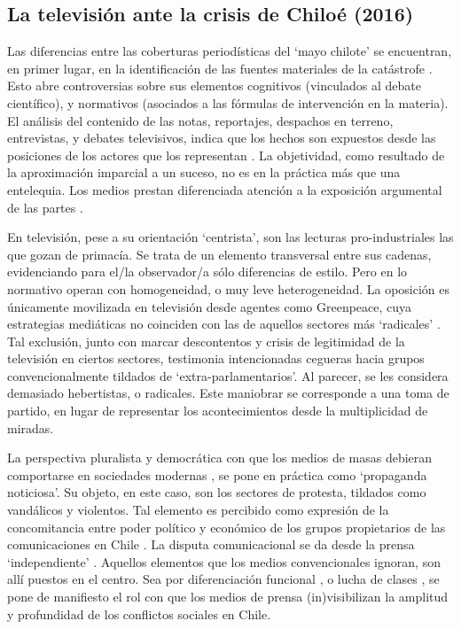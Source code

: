 \documentclass{textolivre}
\begin{document}
\subsection{La televisión ante la crisis de Chiloé (2016)}\label{sec-latelev}

Las diferencias entre las coberturas periodísticas del ‘mayo chilote’ se encuentran,
en primer lugar, en la identificación de las fuentes materiales de la catástrofe
\cite{Mascareo2018b}. Esto abre controversias sobre sus elementos cognitivos
(vinculados al debate científico), y normativos (asociados a las fórmulas de intervención
en la materia). El análisis del contenido de las notas, reportajes, despachos en terreno,
entrevistas, y debates televisivos, indica que los hechos son expuestos desde las
posiciones de los actores que los representan \cite{cabello2018}.
La objetividad, como resultado de la aproximación imparcial a un suceso, no es en la
práctica más que una entelequia. Los medios prestan diferenciada atención a la
exposición argumental de las partes \cite{ValdebenitoAllendes2018}.

En televisión, pese a su orientación ‘centrista’, son las lecturas pro-industriales las
que gozan de primacía. Se trata de un elemento transversal entre sus cadenas,
evidenciando para el/la observador/a sólo diferencias de estilo. Pero en lo normativo
operan con homogeneidad, o muy leve heterogeneidad. La oposición es únicamente
movilizada en televisión desde agentes como Greenpeace, cuya estrategias mediáticas
no coinciden con las de aquellos sectores más ‘radicales’ \cite{ciudadano2016}. Tal
exclusión, junto con marcar descontentos y crisis de legitimidad de la televisión en ciertos
sectores, testimonia intencionadas cegueras hacia grupos convencionalmente tildados de
‘extra-parlamentarios’. Al parecer, se les considera demasiado hebertistas, o radicales.
Este maniobrar se corresponde a una toma de partido, en lugar de representar los
acontecimientos desde la multiplicidad de miradas.

La perspectiva pluralista y democrática con que los medios de masas debieran
comportarse en sociedades modernas \cite{Habermas2006}, se pone en práctica como
‘propaganda noticiosa’. Su objeto, en este caso, son los sectores de protesta, tildados
como vandálicos y violentos. Tal elemento es percibido como expresión de la
concomitancia entre poder político y económico de los grupos propietarios de las
comunicaciones en Chile \cite{Santander2014,solimano}. La disputa
comunicacional se da desde la prensa ‘independiente’ \cite{desconcierto}.
Aquellos elementos que los medios convencionales ignoran, son allí puestos en el centro.
Sea por diferenciación funcional \cite{Luhmann2007}, o lucha de clases \cite{marx2013}, se
pone de manifiesto el rol con que los medios de prensa (in)visibilizan la amplitud y
profundidad de los conflictos sociales en Chile.
\end{document}

